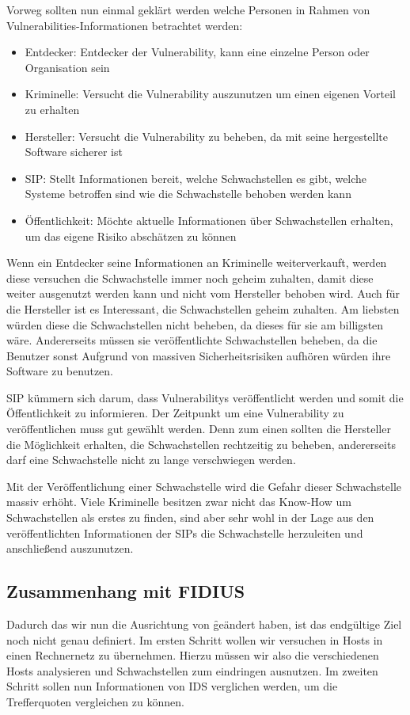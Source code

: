 Vorweg sollten nun einmal geklärt werden welche Personen in Rahmen von
Vulnerabilities-Informationen betrachtet werden:\\
\begin{itemize}
 \item Entdecker: Entdecker der Vulnerability, kann eine einzelne
Person oder Organisation sein
 \item Kriminelle: Versucht die Vulnerability auszunutzen um einen
eigenen Vorteil zu erhalten
 \item Hersteller: Versucht die Vulnerability zu beheben, da mit seine
hergestellte Software sicherer ist
 \item SIP: Stellt Informationen bereit, welche Schwachstellen es
gibt, welche Systeme betroffen sind wie die Schwachstelle behoben
werden kann
 \item Öffentlichkeit: Möchte aktuelle Informationen über
Schwachstellen erhalten, um das eigene Risiko abschätzen zu können
\end{itemize}

Wenn ein Entdecker seine Informationen an Kriminelle weiterverkauft,
werden diese versuchen die Schwachstelle immer noch geheim zuhalten,
damit diese weiter ausgenutzt werden kann und nicht vom Hersteller
behoben wird. Auch für die Hersteller ist es Interessant, die
Schwachstellen geheim zuhalten. Am liebsten würden diese die
Schwachstellen nicht beheben, da dieses für sie am billigsten
wäre. Andererseits müssen sie veröffentlichte Schwachstellen beheben,
da die Benutzer sonst Aufgrund von massiven Sicherheitsrisiken
aufhören würden ihre Software zu benutzen.

SIP kümmern sich darum, dass Vulnerabilitys veröffentlicht werden und
somit die Öffentlichkeit zu informieren. Der Zeitpunkt um eine
Vulnerability zu veröffentlichen muss gut gewählt werden. Denn zum
einen sollten die Hersteller die Möglichkeit erhalten, die
Schwachstellen rechtzeitig zu beheben, andererseits darf eine
Schwachstelle nicht zu lange verschwiegen werden.

Mit der Veröffentlichung einer Schwachstelle wird die Gefahr dieser
Schwachstelle massiv erhöht. Viele Kriminelle besitzen zwar nicht das
Know-How um Schwachstellen als erstes zu finden, sind aber sehr wohl
in der Lage aus den veröffentlichten Informationen der SIPs die
Schwachstelle herzuleiten und anschließend auszunutzen.


\subsection{Zusammenhang mit FIDIUS} Dadurch das wir nun die
Ausrichtung von \f geändert haben, ist das endgültige Ziel noch
nicht genau definiert. Im ersten Schritt wollen wir versuchen in Hosts
in einen Rechnernetz zu übernehmen. Hierzu müssen wir also die
verschiedenen Hosts analysieren und Schwachstellen zum eindringen
ausnutzen. Im zweiten Schritt sollen nun Informationen von IDS
verglichen werden, um die Trefferquoten vergleichen zu können.


